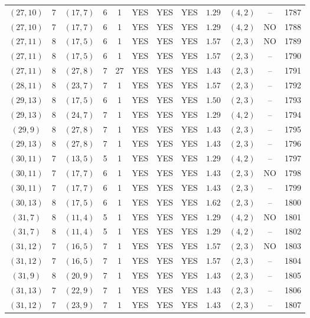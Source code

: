 \begin{longtable}{|c|c|c|c|c|c|c|c|c|c|c|c|}
$(27,10)$ & 7 & $(17,7)$ & 6 & 1 & YES & YES & YES & $1.29$ & $(4,2)$ & -- & 1787\\
$(27,10)$ & 7 & $(17,7)$ & 6 & 1 & YES & YES & YES & $1.29$ & $(4,2)$ & NO & 1788\\
$(27,11)$ & 8 & $(17,5)$ & 6 & 1 & YES & YES & YES & $1.57$ & $(2,3)$ & NO & 1789\\
$(27,11)$ & 8 & $(17,5)$ & 6 & 1 & YES & YES & YES & $1.57$ & $(2,3)$ & -- & 1790\\
$(27,11)$ & 8 & $(27,8)$ & 7 & 27 & YES & YES & YES & $1.43$ & $(2,3)$ & -- & 1791\\
$(28,11)$ & 8 & $(23,7)$ & 7 & 1 & YES & YES & YES & $1.57$ & $(2,3)$ & -- & 1792\\
$(29,13)$ & 8 & $(17,5)$ & 6 & 1 & YES & YES & YES & $1.50$ & $(2,3)$ & -- & 1793\\
$(29,13)$ & 8 & $(24,7)$ & 7 & 1 & YES & YES & YES & $1.29$ & $(4,2)$ & -- & 1794\\
$(29,9)$ & 8 & $(27,8)$ & 7 & 1 & YES & YES & YES & $1.43$ & $(2,3)$ & -- & 1795\\
$(29,13)$ & 8 & $(27,8)$ & 7 & 1 & YES & YES & YES & $1.43$ & $(2,3)$ & -- & 1796\\
$(30,11)$ & 7 & $(13,5)$ & 5 & 1 & YES & YES & YES & $1.29$ & $(4,2)$ & -- & 1797\\
$(30,11)$ & 7 & $(17,7)$ & 6 & 1 & YES & YES & YES & $1.43$ & $(2,3)$ & NO & 1798\\
$(30,11)$ & 7 & $(17,7)$ & 6 & 1 & YES & YES & YES & $1.43$ & $(2,3)$ & -- & 1799\\
$(30,13)$ & 8 & $(17,5)$ & 6 & 1 & YES & YES & YES & $1.62$ & $(2,3)$ & -- & 1800\\
$(31,7)$ & 8 & $(11,4)$ & 5 & 1 & YES & YES & YES & $1.29$ & $(4,2)$ & NO & 1801\\
$(31,7)$ & 8 & $(11,4)$ & 5 & 1 & YES & YES & YES & $1.29$ & $(4,2)$ & -- & 1802\\
$(31,12)$ & 7 & $(16,5)$ & 7 & 1 & YES & YES & YES & $1.57$ & $(2,3)$ & NO & 1803\\
$(31,12)$ & 7 & $(16,5)$ & 7 & 1 & YES & YES & YES & $1.57$ & $(2,3)$ & -- & 1804\\
$(31,9)$ & 8 & $(20,9)$ & 7 & 1 & YES & YES & YES & $1.43$ & $(2,3)$ & -- & 1805\\
$(31,13)$ & 7 & $(22,9)$ & 7 & 1 & YES & YES & YES & $1.43$ & $(2,3)$ & -- & 1806\\
$(31,12)$ & 7 & $(23,9)$ & 7 & 1 & YES & YES & YES & $1.43$ & $(2,3)$ & -- & 1807\\

\end{longtable}
